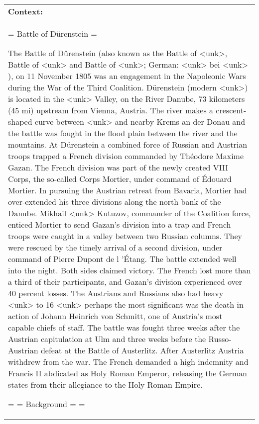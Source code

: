 \documentclass[11pt,a4paper]{article}
\begin{document}
\clearpage

\begin{center}
\scriptsize
\begin{longtable}{p{7.8cm}|p{7.8cm}}
	\toprule
	\multicolumn{2}{p{16cm}}{\textbf{Context:}} \\
	\multicolumn{2}{p{16cm}}{= Battle of D\"{u}renstein = 

The Battle of D\"{u}renstein (also known as the Battle of <unk>, Battle of <unk> and Battle of <unk>; German: <unk> bei <unk> ), on 11 November 1805 was an engagement in the Napoleonic Wars during the War of the Third Coalition. Dürenstein (modern <unk>) is located in the <unk> Valley, on the River Danube, 73 kilometers (45 mi) upstream from Vienna, Austria. The river makes a crescent-shaped curve between <unk> and nearby Krems an der Donau and the battle was fought in the flood plain between the river and the mountains. 
At Dürenstein a combined force of Russian and Austrian troops trapped a French division commanded by Théodore Maxime Gazan. The French division was part of the newly created VIII Corps, the so-called Corps Mortier, under command of \'{E}douard Mortier. In pursuing the Austrian retreat from Bavaria, Mortier had over-extended his three divisions along the north bank of the Danube. Mikhail <unk> Kutuzov, commander of the Coalition force, enticed Mortier to send Gazan's division into a trap and French troops were caught in a valley between two Russian columns. They were rescued by the timely arrival of a second division, under command of Pierre Dupont de l 'Étang. The battle extended well into the night. Both sides claimed victory. The French lost more than a third of their participants, and Gazan's division experienced over 40 percent losses. The Austrians and Russians also had heavy <unk> to 16 <unk> perhaps the most significant was the death in action of Johann Heinrich von Schmitt, one of Austria's most capable chiefs of staff. 
The battle was fought three weeks after the Austrian capitulation at Ulm and three weeks before the Russo-Austrian defeat at the Battle of Austerlitz. After Austerlitz Austria withdrew from the war. The French demanded a high indemnity and Francis II abdicated as Holy Roman Emperor, releasing the German states from their allegiance to the Holy Roman Empire. 

= = Background = = 

}
\end{longtable}
\end{center}
\end{document}

